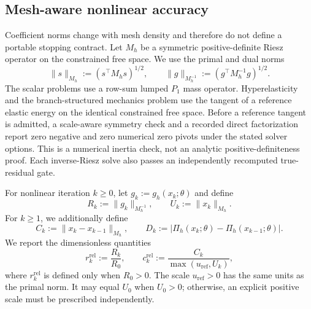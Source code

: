 \subsection{Mesh-aware nonlinear accuracy}
\label{subsec:mesh-aware-stopping}

Coefficient norms change with mesh density and therefore do not define a
portable stopping contract. Let $M_h$ be a symmetric positive-definite Riesz
operator on the constrained free space. We use the primal and dual norms
\begin{equation}
  \lVert s\rVert_{M_h}:=(s^\top M_hs)^{1/2},
  \qquad
  \lVert g\rVert_{M_h^{-1}}:=(g^\top M_h^{-1}g)^{1/2}.
  \label{eq:riesz-primal-dual-norms}
\end{equation}
The scalar problems use a row-sum lumped $P_1$ mass operator. Hyperelasticity and
the branch-structured mechanics problem use the tangent of a reference elastic
energy on the identical constrained free space. Before a reference tangent is
admitted, a scale-aware symmetry check and a recorded direct factorization
report zero negative and zero numerical zero pivots under the stated solver
options. This is a numerical inertia check, not an analytic
positive-definiteness proof. Each
inverse-Riesz solve also passes an independently recomputed true-residual gate.

For nonlinear iteration $k\geq0$, let $g_k:=g_h(x_k;\theta)$ and define
\begin{equation}
  R_k:=\lVert g_k\rVert_{M_h^{-1}},\qquad
  U_k:=\lVert x_k\rVert_{M_h}.
  \label{eq:absolute-residual-state}
\end{equation}
For $k\geq1$, we additionally define
\begin{equation}
  C_k:=\lVert x_k-x_{k-1}\rVert_{M_h},\qquad
  D_k:=\lvert\Pi_h(x_k;\theta)-\Pi_h(x_{k-1};\theta)\rvert.
  \label{eq:absolute-residual-correction}
\end{equation}
We report the dimensionless quantities
\begin{equation}
  r_k^{\mathrm{rel}}:=\frac{R_k}{R_0},
  \qquad
  c_k^{\mathrm{rel}}:=\frac{C_k}{\max(u_{\mathrm{ref}},U_k)},
  \label{eq:relative-residual-correction}
\end{equation}
where $r_k^{\mathrm{rel}}$ is defined only when $R_0>0$. The scale
$u_{\mathrm{ref}}>0$ has the same units as the primal norm. It may equal $U_0$
when $U_0>0$;
otherwise, an explicit positive scale must be prescribed independently.

